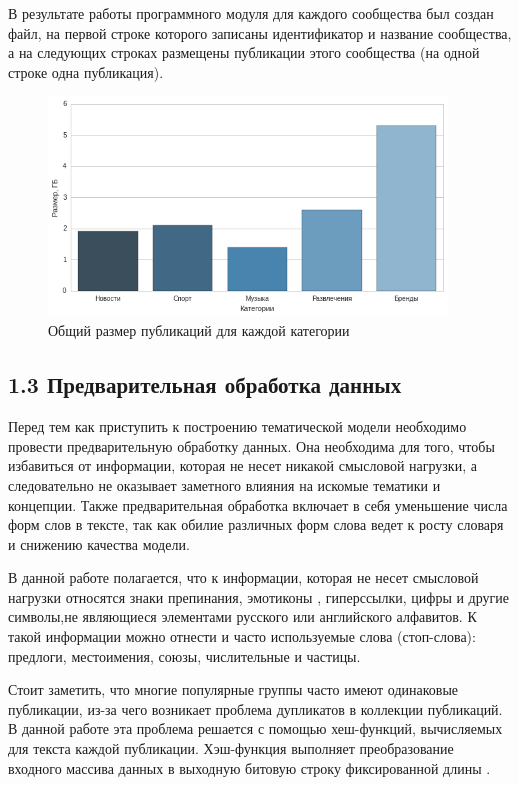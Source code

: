 \documentclass[a4paper]{report}
\begin{document}
В результате  работы программного модуля для каждого сообщества был создан файл, на первой строке которого записаны идентификатор и название сообщества, а на следующих строках размещены публикации этого сообщества (на одной строке одна публикация).

	\begin{figure}
		\centering
		\includegraphics[width=400px]
		{imgs/SizeCat.png}
		\caption{Общий размер публикаций для каждой категории}
		\label{fig:sizecat}
	\end{figure} 
	
	
	
	
	
	
	\subsection{1.3 Предварительная обработка данных}
	Перед тем как приступить к построению тематической модели необходимо провести предварительную обработку данных. 
	Она необходима для того, чтобы избавиться от информации, которая не несет никакой смысловой нагрузки, а следовательно не оказывает заметного влияния на искомые тематики и концепции. 
	Также предварительная обработка включает в себя уменьшение числа форм слов в тексте, так как обилие различных форм слова ведет к росту словаря и снижению качества модели.
	
	В данной работе полагается, что к информации, которая не несет смысловой нагрузки относятся знаки препинания, эмотиконы \cite{bib:smiley}, гиперссылки, цифры и другие символы,не являющиеся элементами русского или английского алфавитов. К такой информации можно отнести и часто используемые слова (стоп-слова): предлоги, местоимения, союзы, числительные и частицы\cite{bib:InformationRetrieval}.
	
	Стоит заметить, что многие популярные группы часто имеют одинаковые публикации, из-за чего возникает проблема дупликатов в коллекции публикаций. В данной работе эта проблема решается с помощью хеш-функций, вычисляемых для текста каждой публикации. Хэш-функция выполняет преобразование входного массива данных в выходную битовую строку фиксированной длины \cite{bib:hash}. 
	
\end{document}
